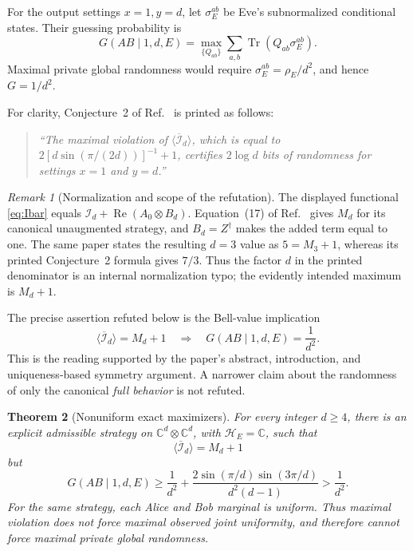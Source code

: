 \documentclass[11pt]{article}
\newtheorem{theorem}{Theorem}[section]
\theoremstyle{remark}
\newtheorem{remark}[theorem]{Remark}
\newcommand{\cI}{\mathcal I}
\newcommand{\cH}{\mathcal H}
\newcommand{\Reop}{\operatorname{Re}}
\newcommand{\Tr}{\operatorname{Tr}}
\newcommand{\bbC}{\mathbb C}
\begin{document}
For the output settings \(x=1,y=d\), let
\(\sigma_E^{ab}\) be Eve's subnormalized conditional states.  Their guessing
probability is
\[
  G(AB\mid1,d,E)
  =
  \max_{\{Q_{ab}\}}\sum_{a,b}\Tr(Q_{ab}\sigma_E^{ab}).
\]
Maximal private global randomness would require
\(\sigma_E^{ab}=\rho_E/d^2\), and hence \(G=1/d^2\).

For clarity, Conjecture~2 of Ref.~\cite{PeritoEtAl2026} is printed as follows:
\begin{quote}
\small\itshape
``The maximal violation of
\(\langle\overline{\mathcal I}_d\rangle\), which is equal to
\(2[d\sin(\pi/(2d))]^{-1}+1\), certifies \(2\log d\) bits of randomness
for settings \(x=1\) and \(y=d\).''
\end{quote}

\begin{remark}[Normalization and scope of the refutation]
\label{rem:interpretation}
The displayed functional \eqref{eq:Ibar} equals
\(\cI_d+\Reop(A_0\otimes B_d)\).  Equation~(17) of
Ref.~\cite{PeritoEtAl2026} gives \(M_d\) for its canonical unaugmented
strategy, and \(B_d=Z^\dagger\) makes the added term equal to one.  The same
paper states the resulting \(d=3\) value as \(5=M_3+1\), whereas its printed
Conjecture~2 formula gives \(7/3\).  Thus the factor \(d\) in the printed
denominator is an internal normalization typo; the evidently intended
maximum is \(M_d+1\).

The precise assertion refuted below is the Bell-value implication
\begin{equation}
  \langle\overline{\cI}_d\rangle=M_d+1
  \quad\Longrightarrow\quad
  G(AB\mid1,d,E)=\frac1{d^2}.
  \label{eq:value-implication}
\end{equation}
This is the reading supported by the paper's abstract, introduction, and
uniqueness-based symmetry argument.  A narrower claim about the randomness
of only the canonical \emph{full behavior} is not refuted.
\end{remark}

\begin{theorem}[Nonuniform exact maximizers]\label{thm:main}
For every integer \(d\geq4\), there is an explicit admissible strategy on
\(\bbC^d\otimes\bbC^d\), with \(\cH_E=\bbC\), such that
\[
  \langle\overline{\cI}_d\rangle=M_d+1
\]
but
\begin{equation}
  G(AB\mid1,d,E)
  \geq\frac1{d^2}
  +\frac{2\sin(\pi/d)\sin(3\pi/d)}{d^2(d-1)}
  >\frac1{d^2}.
  \label{eq:guess-gap}
\end{equation}
For the same strategy, each Alice and Bob marginal is uniform.  Thus maximal
violation does not force maximal observed joint uniformity, and therefore
cannot force maximal private global randomness.
\end{theorem}
\end{document}
